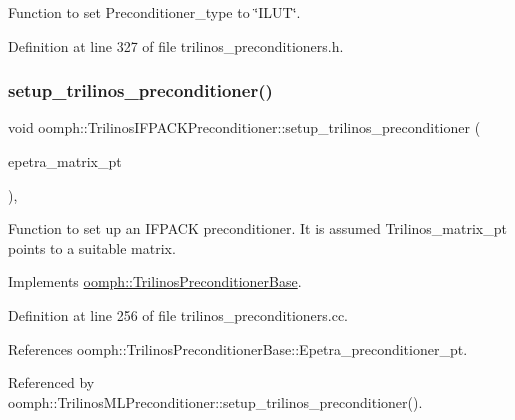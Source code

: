 Function to set Preconditioner\+\_\+type to \char`\"{}\+I\+L\+U\+T\char`\"{}. 



Definition at line 327 of file trilinos\+\_\+preconditioners.\+h.

\mbox{\label{classoomph_1_1TrilinosIFPACKPreconditioner_a947df99c1dd6afa6a3149d045f9452a4}} 
\subsubsection{\texorpdfstring{setup\+\_\+trilinos\+\_\+preconditioner()}{setup\_trilinos\_preconditioner()}}
{\footnotesize\ttfamily void oomph\+::\+Trilinos\+I\+F\+P\+A\+C\+K\+Preconditioner\+::setup\+\_\+trilinos\+\_\+preconditioner (\begin{DoxyParamCaption}\item[{Epetra\+\_\+\+Crs\+Matrix $\ast$}]{epetra\+\_\+matrix\+\_\+pt }\end{DoxyParamCaption})\hspace{0.3cm}{\ttfamily [protected]}, {\ttfamily [virtual]}}



Function to set up an I\+F\+P\+A\+CK preconditioner. It is assumed Trilinos\+\_\+matrix\+\_\+pt points to a suitable matrix. 



Implements \hyperlink{classoomph_1_1TrilinosPreconditionerBase_aeb2b1cee61617fd68a8beb911ddc4a62}{oomph\+::\+Trilinos\+Preconditioner\+Base}.



Definition at line 256 of file trilinos\+\_\+preconditioners.\+cc.



References oomph\+::\+Trilinos\+Preconditioner\+Base\+::\+Epetra\+\_\+preconditioner\+\_\+pt.



Referenced by oomph\+::\+Trilinos\+M\+L\+Preconditioner\+::setup\+\_\+trilinos\+\_\+preconditioner().




